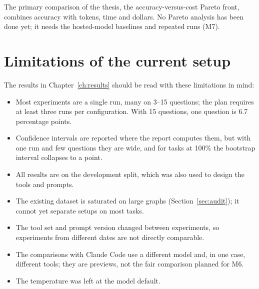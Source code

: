 The primary comparison of the thesis, the accuracy-versus-cost Pareto front, combines accuracy with tokens, time and
dollars. No Pareto analysis has been done yet; it needs the hosted-model baselines and repeated runs (M7).

\section{Limitations of the current setup}

The results in Chapter~\ref{ch:results} should be read with these limitations in mind:
\begin{itemize}
  \item Most experiments are a single run, many on 3--15 questions; the plan requires at least three runs per
        configuration. With 15 questions, one question is 6.7 percentage points.
  \item Confidence intervals are reported where the report computes them, but with one run and few questions they
        are wide, and for tasks at 100\% the bootstrap interval collapses to a point.
  \item All results are on the development split, which was also used to design the tools and prompts.
  \item The existing dataset is saturated on large graphs (Section~\ref{sec:audit}); it cannot yet separate setups on
        most tasks.
  \item The tool set and prompt version changed between experiments, so experiments from different dates are not
        directly comparable.
  \item The comparisons with Claude Code use a different model and, in one case, different tools; they are
        previews, not the fair comparison planned for M6.
  \item The temperature was left at the model default.
\end{itemize}
